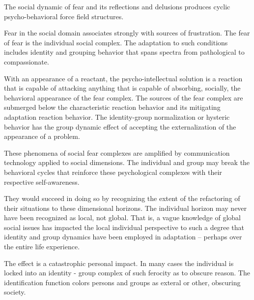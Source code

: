 

The social dynamic of fear and its reflections and delusions produces
cyclic psycho-behavioral force field structures.

Fear in the social domain associates strongly with sources of
frustration.  The fear of fear is the individual social complex.  The
adaptation to such conditions includes identity and grouping behavior
that spans spectra from pathological to compassionate.  

With an appearance of a reactant, the psycho-intellectual solution is
a reaction that is capable of attacking anything that is capable of
absorbing, socially, the behavioral appearance of the fear complex.
The sources of the fear complex are submerged below the characteristic
reaction behavior and its mitigating adaptation reaction behavior.
The identity-group normalization or hysteric behavior has the group
dynamic effect of accepting the externalization of the appearance of a
problem.

These phenomena of social fear complexes are amplified by
communication technology applied to social dimensions.  The individual
and group may break the behavioral cycles that reinforce these
psychological complexes with their respective self-awareness.  

They would succeed in doing so by recognizing the extent of the
refactoring of their situations to these dimensional horizons.  The
individual horizon may never have been recognized as local, not
global.  That is, a vague knowledge of global social issues has
impacted the local individual perspective to such a degree that
identity and group dynamics have been employed in adaptation --
perhaps over the entire life experience.

The effect is a catastrophic personal impact.  In many cases the
individual is locked into an identity - group complex of such ferocity
as to obscure reason.  The identification function colors persons and
groups as exteral or other, obscuring society.

\bye
